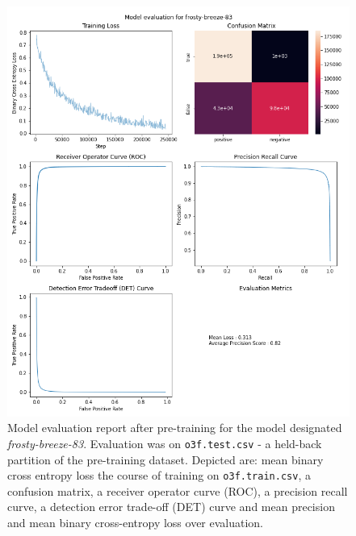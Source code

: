 \documentclass[16pt]{book}
\begin{document}
\begin{figure}
	\caption{\label{frostybreeze} Model evaluation report after pre-training for the model designated \textit{frosty-breeze-83}. Evaluation was on \texttt{o3f.test.csv} - a held-back partition of the pre-training dataset. Depicted are:
	mean binary cross entropy loss the course of training on \texttt{o3f.train.csv},  
	a confusion matrix, 
	a receiver operator curve (ROC), 
	a precision recall curve,
	a detection error trade-off (DET) curve and 
	mean precision and mean binary cross-entropy loss over evaluation.}
	\includegraphics[width = \textwidth]{img/frosty-breeze-83-eval.png}
\end{figure}
\end{document}
